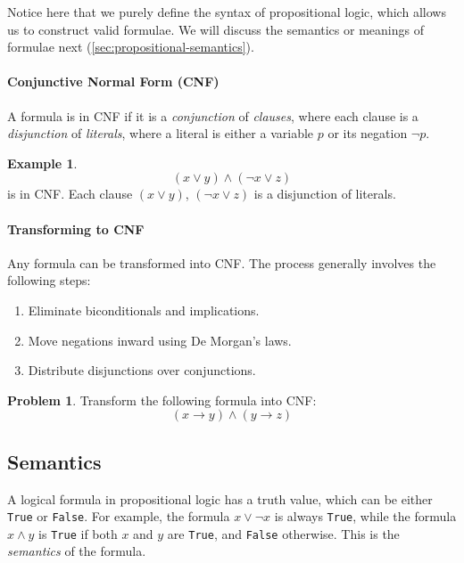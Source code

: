 \documentclass[oneside,11pt,dvipsnames]{book}
\numberwithin{equation}{section}
\theoremstyle{definition}
\newtheorem{example}{Example}[section]
\newtheorem{problem}{Problem}[section]
\theoremstyle{remark}
\newenvironment{commentbox}[1][]{
  \small
  \begin{mybox}
    {\small \textbf{#1}}
  }{
  \end{mybox}
}
\begin{document}
\begin{commentbox}
Notice here that we purely define the syntax of propositional logic, which allows us to construct valid formulae. We will discuss the semantics or meanings of formulae next (\autoref{sec:propositional-semantics}).
\end{commentbox}

\paragraph{Conjunctive Normal Form (CNF)} A formula is in CNF if it is a \emph{conjunction} of  \emph{clauses}, where each clause is a \emph{disjunction} of \emph{literals}, where a literal is either a variable $p$ or its negation $\lnot{p}$.

\begin{example}
\[
(x \lor y) \land (\lnot{x} \lor z)
\]
is in CNF. Each clause $(x \lor y)$, $(\lnot{x} \lor z)$ is a disjunction of literals.
\end{example}


\paragraph{Transforming to CNF} Any formula can be transformed into CNF. The process generally involves the following steps:
\begin{enumerate}
\item Eliminate biconditionals and implications.
\item Move negations inward using De Morgan's laws.
\item Distribute disjunctions over conjunctions.
\end{enumerate}

\begin{problem}
Transform the following formula into CNF:
\[
(x \to y) \land (y \to z)
\]
\end{problem}




\subsection{Semantics}\label{sec:propositional-semantics}

A logical formula in propositional logic has a truth value, which can be either \texttt{True} or \texttt{False}.
For example, the formula $x \lor \lnot{x}$ is always \texttt{True}, while the formula $x \land y$ is \texttt{True} if both $x$ and $y$ are \texttt{True}, and \texttt{False} otherwise.
This is the \emph{semantics} of the formula.
\end{document}
